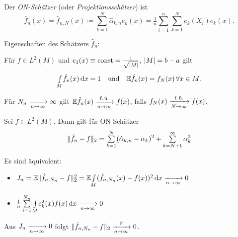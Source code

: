 \documentclass{cheat-sheet}
\renewcommand{\P}{\mathbb{P}} %
\newcommand{\E}{\mathbb{E}} %
\begin{document}
\begin{defn}
  Der \emph{ON-Schätzer} (oder \textit{Projektionsschätzer}) ist
  \[
    \hat{f}_n (x) = \hat{f}_{n,N} (x) \coloneqq \sum_{k=1}^N \hat{\alpha}_{k,n} e_k(x) = \tfrac{1}{n} \sum_{i=1}^n \sum_{k=1}^N e_k(X_i) e_k(x).
  \]
\end{defn}

Eigenschaften des Schätzers $\hat{f}_n$:


\begin{lem}
  Für $f \in L^2 (M)$ und $e_1 (x) \equiv \mathrm{const} = \tfrac{1}{\sqrt{\lvert M\rvert}}$, $\lvert M\rvert = b - a$ gilt
  \[
    \Int{M}{}{\hat{f}_n(x)}{x} = 1
    \quad \text{und} \quad
    \E \hat{f}_n(x) = f_N(x) \, \forall x \in M.
  \]
\end{lem}


\begin{kor}
  Für $N_n \xrightarrow[n \to \infty]{} \infty$ gilt $\E \hat{f}_n(x) \xra[n \to \infty]{\text{f.\,ü.}} f(x)$, falls $f_N(x) \xrightarrow[N \to \infty]{\text{f.\,ü.}} f(x)$.
\end{kor}

\begin{lem}
  Sei $f \in L^2(M)$.
  Dann gilt für ON-Schätzer
  \[
    \norm{\hat{f}_n - f}_2 = \sum_{k=1}^N (\hat{\alpha}_{k,n} - \alpha_k)^2 + \sum_{k = N+1}^\infty \alpha_k^2
  \]
\end{lem}


\begin{satz}
  Es sind äquivalent:
  \begin{itemize}
    \item $J_n = \E \norm{\hat{f}_{n,N_n} - f}_2^2 = \E \AInt{M}{(\hat{f}_{n,N_n}(x) - f(x))^2}{x} \xra[n \to \infty]{} 0$
    \item $\tfrac{1}{n} \sum_{i=1}^{N_n} \AInt{M}{e_k^2(x) f(x)}{x} \xra[n \to \infty]{} 0$
  \end{itemize}
\end{satz}

\begin{kor}
  Aus $J_n \xrightarrow[n \to \infty]{} 0$ folgt $\norm{\hat{f}_{n,N_n} - f}_2 \xra[n \to \infty]{\P} 0$.
\end{kor}

\end{document}
